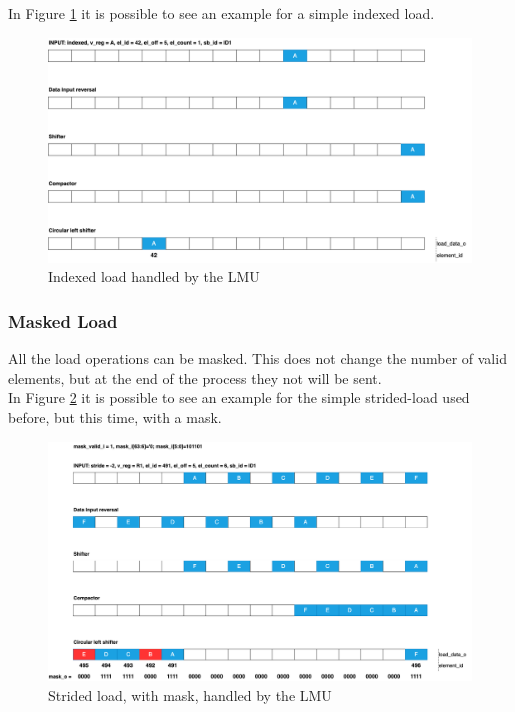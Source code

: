 In Figure \ref{lmu-indexed} it is possible to see an example for a simple indexed load.

\begin{figure}[H]
    \centering
    \includegraphics[scale = 0.25]{Chapter_2/img/lmu-indexed.png}
    \caption{Indexed load handled by the LMU}
    \label{lmu-indexed}
\end{figure}

\subsubsection{Masked Load}
All the load operations can be masked. This does not change the number of valid elements, but at the end of the process they not will be sent.\\


In Figure \ref{lmu-masked-stride} it is possible to see an example for the simple strided-load used before, but this time, with a mask.

\begin{figure}[H]
    \centering
    \includegraphics[scale = 0.25]{Chapter_2/img/lmu-masked-strided.png}
    \caption{Strided load, with mask, handled by the LMU}
    \label{lmu-masked-stride}
\end{figure}


